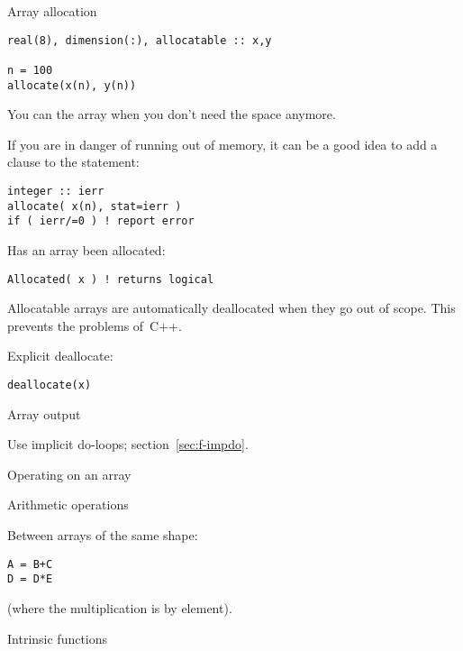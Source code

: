 \begin{block}{Array allocation}
  \label{sl:farray-alloc}
\begin{verbatim}
real(8), dimension(:), allocatable :: x,y

n = 100
allocate(x(n), y(n))
\end{verbatim}
You can  the array when you don't need the
space anymore.
\end{block}

If you are in danger of running out of memory, it can be a good idea
to add a  clause to the  statement:
\begin{verbatim}
integer :: ierr
allocate( x(n), stat=ierr )
if ( ierr/=0 ) ! report error
\end{verbatim}

Has an array been allocated:
\begin{verbatim}
Allocated( x ) ! returns logical
\end{verbatim}

Allocatable arrays are automatically deallocated when they go out of
scope. This prevents the  problems of~C++.

Explicit deallocate:
\begin{verbatim}
deallocate(x)
\end{verbatim}

 {Array output}

Use implicit do-loops; section~\ref{sec:f-impdo}.

 {Operating on an array}

 {Arithmetic operations}

Between arrays of the same shape:
\begin{verbatim}
A = B+C
D = D*E
\end{verbatim}
(where the multiplication is by element).

 {Intrinsic functions}

